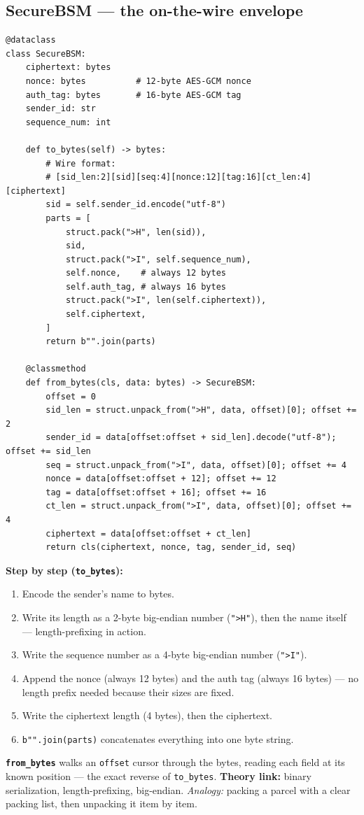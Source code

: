 \documentclass[11pt,a4paper]{report}
\begin{document}
\subsection{SecureBSM --- the on-the-wire envelope}
\begin{lstlisting}[style=py,caption={v2v\_protocol.py --- SecureBSM and its binary wire format.}]
@dataclass
class SecureBSM:
    ciphertext: bytes
    nonce: bytes          # 12-byte AES-GCM nonce
    auth_tag: bytes       # 16-byte AES-GCM tag
    sender_id: str
    sequence_num: int

    def to_bytes(self) -> bytes:
        # Wire format:
        # [sid_len:2][sid][seq:4][nonce:12][tag:16][ct_len:4][ciphertext]
        sid = self.sender_id.encode("utf-8")
        parts = [
            struct.pack(">H", len(sid)),
            sid,
            struct.pack(">I", self.sequence_num),
            self.nonce,    # always 12 bytes
            self.auth_tag, # always 16 bytes
            struct.pack(">I", len(self.ciphertext)),
            self.ciphertext,
        ]
        return b"".join(parts)

    @classmethod
    def from_bytes(cls, data: bytes) -> SecureBSM:
        offset = 0
        sid_len = struct.unpack_from(">H", data, offset)[0]; offset += 2
        sender_id = data[offset:offset + sid_len].decode("utf-8"); offset += sid_len
        seq = struct.unpack_from(">I", data, offset)[0]; offset += 4
        nonce = data[offset:offset + 12]; offset += 12
        tag = data[offset:offset + 16]; offset += 16
        ct_len = struct.unpack_from(">I", data, offset)[0]; offset += 4
        ciphertext = data[offset:offset + ct_len]
        return cls(ciphertext, nonce, tag, sender_id, seq)
\end{lstlisting}
\textbf{Step by step (\texttt{to\_bytes}):}
\begin{enumerate}
  \item Encode the sender's name to bytes.
  \item Write its length as a 2-byte big-endian number (\texttt{">H"}), then the
        name itself --- length-prefixing in action.
  \item Write the sequence number as a 4-byte big-endian number (\texttt{">I"}).
  \item Append the nonce (always 12 bytes) and the auth tag (always 16 bytes) ---
        no length prefix needed because their sizes are fixed.
  \item Write the ciphertext length (4 bytes), then the ciphertext.
  \item \texttt{b"".join(parts)} concatenates everything into one byte string.
\end{enumerate}
\textbf{\texttt{from\_bytes}} walks an \texttt{offset} cursor through the bytes,
reading each field at its known position --- the exact reverse of
\texttt{to\_bytes}. \textbf{Theory link:} binary serialization, length-prefixing,
big-endian. \emph{Analogy:} packing a parcel with a clear packing list, then
unpacking it item by item.
\end{document}
